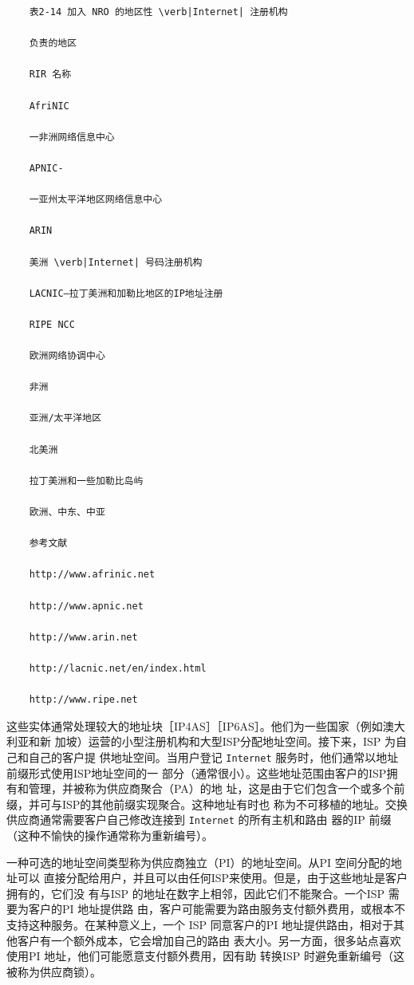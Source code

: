 \begin{verbatim}
    表2-14 加入 NRO 的地区性 \verb|Internet| 注册机构
    
    负责的地区
    
    RIR 名称
    
    AfriNIC
    
    一非洲网络信息中心
    
    APNIC-
    
    一亚州太平洋地区网络信息中心
    
    ARIN
    
    美洲 \verb|Internet| 号码注册机构
    
    LACNIC—拉丁美洲和加勒比地区的IP地址注册
    
    RIPE NCC
    
    欧洲网络协调中心
    
    非洲
    
    亚洲/太平洋地区
    
    北美洲
    
    拉丁美洲和一些加勒比岛屿
    
    欧洲、中东、中亚
    
    参考文献
    
    http://www.afrinic.net
    
    http://www.apnic.net
    
    http://www.arin.net
    
    http://lacnic.net/en/index.html
    
    http://www.ripe.net
\end{verbatim}

这些实体通常处理较大的地址块［IP4AS］［IP6AS］。他们为一些国家（例如澳大利亚和新
加坡）运营的小型注册机构和大型ISP分配地址空间。接下来，ISP 为自己和自己的客户提
供地址空间。当用户登记 \verb|Internet| 服务时，他们通常以地址前缀形式使用ISP地址空间的一
部分（通常很小）。这些地址范围由客户的ISP拥有和管理，并被称为供应商聚合（PA）的地
址，这是由于它们包含一个或多个前缀，并可与ISP的其他前缀实现聚合。这种地址有时也
称为不可移植的地址。交换供应商通常需要客户自己修改连接到 \verb|Internet| 的所有主机和路由
器的IP 前缀（这种不愉快的操作通常称为重新编号）。

一种可选的地址空间类型称为供应商独立（PI）的地址空间。从PI 空间分配的地址可以
直接分配给用户，并且可以由任何ISP来使用。但是，由于这些地址是客户拥有的，它们没
有与ISP 的地址在数字上相邻，因此它们不能聚合。一个ISP 需要为客户的PI 地址提供路
由，客户可能需要为路由服务支付额外费用，或根本不支持这种服务。在某种意义上，一个
ISP 同意客户的PI 地址提供路由，相对于其他客户有一个额外成本，它会增加自己的路由
表大小。另一方面，很多站点喜欢使用PI 地址，他们可能愿意支付额外费用，因有助
转换ISP 时避免重新编号（这被称为供应商锁）。


